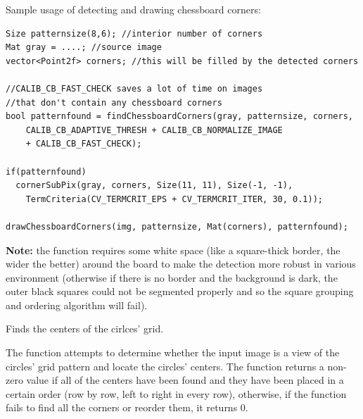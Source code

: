 Sample usage of detecting and drawing chessboard corners:
\begin{lstlisting}
Size patternsize(8,6); //interior number of corners
Mat gray = ....; //source image
vector<Point2f> corners; //this will be filled by the detected corners

//CALIB_CB_FAST_CHECK saves a lot of time on images
//that don't contain any chessboard corners
bool patternfound = findChessboardCorners(gray, patternsize, corners,
    CALIB_CB_ADAPTIVE_THRESH + CALIB_CB_NORMALIZE_IMAGE
    + CALIB_CB_FAST_CHECK);

if(patternfound)
  cornerSubPix(gray, corners, Size(11, 11), Size(-1, -1),
    TermCriteria(CV_TERMCRIT_EPS + CV_TERMCRIT_ITER, 30, 0.1));

drawChessboardCorners(img, patternsize, Mat(corners), patternfound);
\end{lstlisting}

\textbf{Note:} the function requires some white space (like a square-thick border, the wider the better) around the board to make the detection more robust in various environment (otherwise if there is no border and the background is dark, the outer black squares could not be segmented properly and so the square grouping and ordering algorithm will fail).

\ifCpp
{}
Finds the centers of the cirlces' grid.
\begin{description}
\end{description}

The function attempts to determine
whether the input image is a view of the circles' grid pattern and
locate the circles' centers. The function returns a
non-zero value if all of the centers have been found and they have been placed
in a certain order (row by row, left to right in every row),
otherwise, if the function fails to find all the corners or reorder
them, it returns 0.

